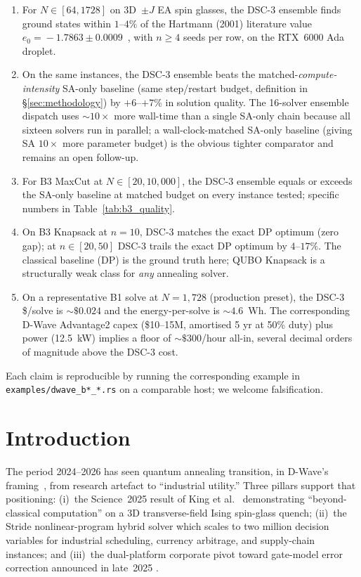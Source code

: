 \documentclass[11pt,a4paper]{article}
\begin{document}
\begin{enumerate}\itemsep0.15em
\item[\textbf{C1.}] For $N \in [64, 1728]$ on 3D~$\pm J$ EA spin glasses,
  the DSC-3 ensemble finds ground states within $1$--$4\%$ of the
  Hartmann (2001) literature value
  $e_0\!=\!-1.7863 \pm 0.0009$~\cite{hartmann_2001}, with $n\!\ge\!4$
  seeds per row, on the RTX~6000 Ada droplet.
\item[\textbf{C2.}] On the same instances, the DSC-3 ensemble beats
  the matched-\emph{compute-intensity} SA-only baseline (same
  step/restart budget, definition in \S\ref{sec:methodology}) by
  $+6$--$+7\%$ in solution quality. The 16-solver ensemble dispatch
  uses $\sim\!10\times$ more wall-time than a single SA-only chain
  because all sixteen solvers run in parallel; a wall-clock-matched
  SA-only baseline (giving SA $10\times$ more parameter budget) is
  the obvious tighter comparator and remains an open follow-up.
\item[\textbf{C3.}] For B3 MaxCut at $N \in [20, 10{,}000]$, the DSC-3
  ensemble equals or exceeds the SA-only baseline at matched budget on
  every instance tested; specific numbers in Table~\ref{tab:b3_quality}.
\item[\textbf{C4.}] On B3 Knapsack at $n\!=\!10$, DSC-3 matches the
  exact DP optimum (zero gap); at $n\!\in\![20, 50]$ DSC-3 trails the
  exact DP optimum by $4$--$17\%$. The classical baseline (DP) is the
  ground truth here; QUBO Knapsack is a structurally weak class for
  \emph{any} annealing solver.
\item[\textbf{C5.}] On a representative B1 solve at $N\!=\!1{,}728$
  (production preset), the DSC-3 \$/solve is $\sim\!\$0.024$ and the
  energy-per-solve is $\sim\!4.6$~Wh. The corresponding D-Wave Advantage2 capex
  (\$10--15M, amortised 5 yr at 50\% duty) plus power (12.5~kW)
  implies a floor of $\sim\!\$300$/hour all-in, several decimal orders
  of magnitude above the DSC-3 cost.
\end{enumerate}

Each claim is reproducible by running the corresponding example in
\texttt{examples/dwave\_b*\_*.rs} on a comparable host; we welcome
falsification.

\section{Introduction}

The period 2024--2026 has seen quantum annealing transition, in D-Wave's
framing~\cite{dwave_select_papers,dwave_advantage2,dwave_beyond_classical},
from research artefact to ``industrial utility.'' Three pillars support that
positioning: (i)~the Science~2025 result of King et al.\
\cite{king_beyond_classical_2025} demonstrating ``beyond-classical computation''
on a 3D transverse-field Ising spin-glass quench; (ii)~the Stride
nonlinear-program hybrid solver \cite{booth_stride_2024} which scales to two
million decision variables for industrial scheduling, currency arbitrage, and
supply-chain instances; and (iii)~the dual-platform corporate pivot toward
gate-model error correction announced in late~2025 \cite{dwave_dual_platform}.
\end{document}
